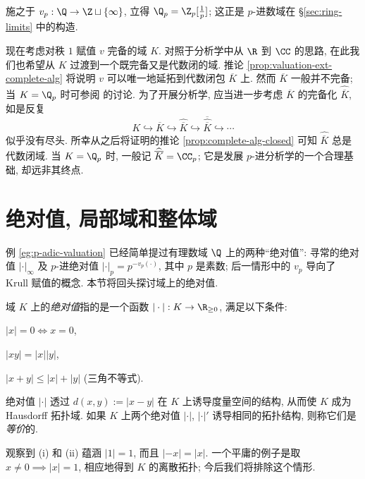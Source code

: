 施之于 $v_p: \Q \to \Z \sqcup \{\infty\}$, 立得 $\Q_p = \Z_p[\frac{1}{p}]$; 这正是 $p$-进数域在 \S\ref{sec:ring-limits} 中的构造.

现在考虑对秩 $1$ 赋值 $v$ 完备的域 $K$. 对照于分析学中从 $\R$ 到 $\CC$ 的思路, 在此我们也希望从 $K$ 过渡到一个既完备又是代数闭的域. 推论 \ref{prop:valuation-ext-complete-alg} 将说明 $v$ 可以唯一地延拓到代数闭包 $\overline{K}$ 上. 然而 $\overline{K}$ 一般并不完备; 当 $K = \Q_p$ 时可参阅 \cite[Proposition 5.1]{Was97} 的讨论. 为了开展分析学, 应当进一步考虑 $\overline{K}$ 的完备化 $\widehat{\overline{K}}$, 如是反复
\[ K \hookrightarrow \overline{K} \hookrightarrow \widehat{\overline{K}} \hookrightarrow \overline{\widehat{\overline{K}}} \hookrightarrow \cdots \]
似乎没有尽头. 所幸从之后将证明的推论 \ref{prop:complete-alg-closed} 可知 $\widehat{\overline{K}}$ 总是代数闭域. 当 $K = \Q_p$ 时, 一般记 $\widehat{\overline{K}} = \CC_p$; 它是发展 $p$-进分析学的一个合理基础, 却远非其终点. 

\section{绝对值, 局部域和整体域}\label{sec:absolute-value}
例 \ref{eg:p-adic-valuation} 已经简单提过有理数域 $\Q$ 上的两种``绝对值'': 寻常的绝对值 $|\cdot|_\infty$ 及 $p$-进绝对值 $|\cdot|_p = p^{-v_p(\cdot)}$, 其中 $p$ 是素数; 后一情形中的 $v_p$ 导向了 Krull 赋值的概念. 本节将回头探讨域上的绝对值.

\begin{definition}[绝对值]
	域 $K$ 上的\emph{绝对值}指的是一个函数 $|\cdot|: K \to \R_{\geq 0}$, 满足以下条件:
	\begin{compactenum}[(i)]
		\item $|x|=0 \iff x=0$,
		\item $|xy|=|x| |y|$,
		\item $|x+y| \leq |x|+|y|$ (三角不等式).
	\end{compactenum}
	绝对值 $|\cdot|$ 透过 $d(x,y) := |x-y|$ 在 $K$ 上诱导度量空间的结构, 从而使 $K$ 成为 Hausdorff 拓扑域. 如果 $K$ 上两个绝对值 $|\cdot|$, $|\cdot|'$ 诱导相同的拓扑结构, 则称它们是\emph{等价}的.
\end{definition}
观察到 (i) 和 (ii) 蕴涵 $|1|=1$, 而且 $|-x|=|x|$. 一个平庸的例子是取 $x \neq 0 \implies |x|=1$, 相应地得到 $K$ 的离散拓扑; 今后我们将排除这个情形.

